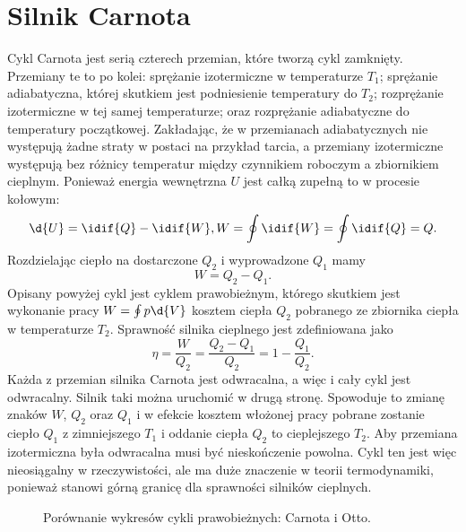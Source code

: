 \section{Silnik Carnota}
Cykl Carnota jest serią czterech przemian, które tworzą cykl zamknięty. Przemiany te to po kolei: sprężanie izotermiczne w temperaturze $T_1$; sprężanie adiabatyczna, której skutkiem jest podniesienie temperatury do $T_2$; rozprężanie izotermiczne w tej samej temperaturze; oraz rozprężanie adiabatyczne do temperatury początkowej. Zakładając, że w przemianach adiabatycznych nie występują żadne straty w postaci na przykład tarcia, a przemiany izotermiczne występują bez różnicy temperatur między czynnikiem roboczym a zbiornikiem cieplnym. Ponieważ energia wewnętrzna $U$ jest całką zupełną to w procesie kołowym:
\begin{gather}
\d{U} = \idif{Q} - \idif{W},
W = \oint \idif{W} = \oint \idif{Q} = Q.
\end{gather}
Rozdzielając ciepło na dostarczone $Q_2$ i wyprowadzone $Q_1$ mamy
\begin{equation}
W = Q_2 - Q_1.
\end{equation}
Opisany powyżej cykl jest cyklem prawobieżnym, którego skutkiem jest wykonanie pracy $W = \oint p \d{V}$ kosztem ciepła $Q_2$ pobranego ze zbiornika ciepła w temperaturze $T_2$. 
Sprawność silnika cieplnego jest zdefiniowana jako
\begin{equation}\label{eq:def_sprawnosc_silnika}
\eta = \frac{W}{Q_2} = \frac{Q_2 - Q_1}{Q_2} = 1 - \frac{Q_1}{Q_2}.
\end{equation}
Każda z przemian silnika Carnota jest odwracalna, a więc i cały cykl jest odwracalny. Silnik taki można uruchomić w drugą stronę. Spowoduje to zmianę znaków $W$, $Q_2$ oraz $Q_1$ i w efekcie kosztem włożonej pracy pobrane zostanie ciepło $Q_1$ z zimniejszego $T_1$ i oddanie ciepła $Q_2$ to cieplejszego $T_2$. Aby przemiana izotermiczna była odwracalna musi być nieskończenie powolna. Cykl ten jest więc nieosiągalny w rzeczywistości, ale ma duże znaczenie w teorii termodynamiki, ponieważ stanowi górną granicę dla sprawności silników cieplnych.

\begin{figure}[H]
	\centering
	\begin{subfigure}{0.45\textwidth}
		\centering
		
		\caption{}
		\label{fig:pv_silnik_carnot}
	\end{subfigure}
	\begin{subfigure}{0.45\textwidth}
		\centering
		
		\caption{}
		\label{fig:pv_silnik_otto}
	\end{subfigure}
	\captionsetup{subrefformat=parens}
	\caption{Porównanie wykresów cykli prawobieżnych:  Carnota i  Otto.}
\end{figure}